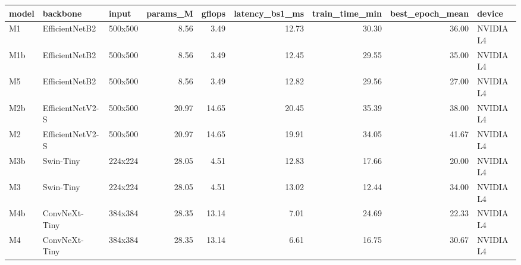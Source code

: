 \begin{tabular}{lllrrrrrl}
\toprule
model & backbone & input & params\_M & gflops & latency\_bs1\_ms & train\_time\_min & best\_epoch\_mean & device \\
\midrule
M1 & EfficientNetB2 & 500x500 & 8.56 & 3.49 & 12.73 & 30.30 & 36.00 & NVIDIA L4 \\
M1b & EfficientNetB2 & 500x500 & 8.56 & 3.49 & 12.45 & 29.55 & 35.00 & NVIDIA L4 \\
M5 & EfficientNetB2 & 500x500 & 8.56 & 3.49 & 12.82 & 29.56 & 27.00 & NVIDIA L4 \\
M2b & EfficientNetV2-S & 500x500 & 20.97 & 14.65 & 20.45 & 35.39 & 38.00 & NVIDIA L4 \\
M2 & EfficientNetV2-S & 500x500 & 20.97 & 14.65 & 19.91 & 34.05 & 41.67 & NVIDIA L4 \\
M3b & Swin-Tiny & 224x224 & 28.05 & 4.51 & 12.83 & 17.66 & 20.00 & NVIDIA L4 \\
M3 & Swin-Tiny & 224x224 & 28.05 & 4.51 & 13.02 & 12.44 & 34.00 & NVIDIA L4 \\
M4b & ConvNeXt-Tiny & 384x384 & 28.35 & 13.14 & 7.01 & 24.69 & 22.33 & NVIDIA L4 \\
M4 & ConvNeXt-Tiny & 384x384 & 28.35 & 13.14 & 6.61 & 16.75 & 30.67 & NVIDIA L4 \\
\bottomrule
\end{tabular}
